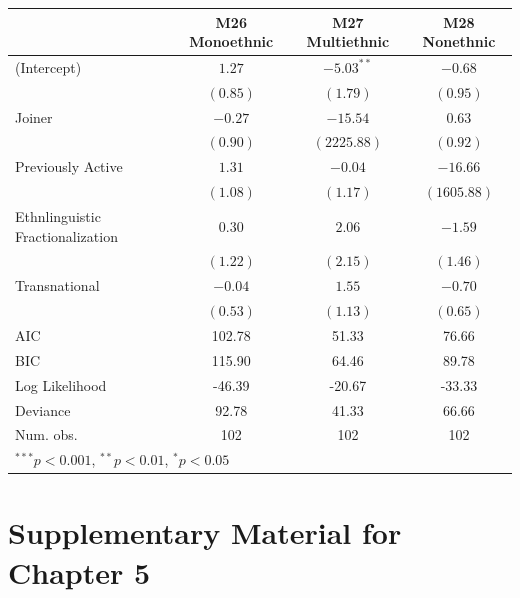 \documentclass[12pt,]{book}
\let\origtable\table
\let\endorigtable\endtable
\renewenvironment{table}[1][2] {
    \singlespacing
    \expandafter\origtable\expandafter[H]
} {
    \endorigtable
}
\theoremstyle{definition}
\theoremstyle{definition}
\theoremstyle{definition}
\theoremstyle{remark}
\begin{document}
\begin{table}
\begin{center}
\begin{tabular}{l c c c }
\hline
 & M26 Monoethnic & M27 Multiethnic & M28 Nonethnic \\
\hline
(Intercept)                      & $1.27$   & $-5.03^{**}$ & $-0.68$     \\
                                 & $(0.85)$ & $(1.79)$     & $(0.95)$    \\
Joiner                           & $-0.27$  & $-15.54$     & $0.63$      \\
                                 & $(0.90)$ & $(2225.88)$  & $(0.92)$    \\
Previously Active                & $1.31$   & $-0.04$      & $-16.66$    \\
                                 & $(1.08)$ & $(1.17)$     & $(1605.88)$ \\
Ethnlinguistic Fractionalization & $0.30$   & $2.06$       & $-1.59$     \\
                                 & $(1.22)$ & $(2.15)$     & $(1.46)$    \\
Transnational                    & $-0.04$  & $1.55$       & $-0.70$     \\
                                 & $(0.53)$ & $(1.13)$     & $(0.65)$    \\
\hline
AIC                              & 102.78   & 51.33        & 76.66       \\
BIC                              & 115.90   & 64.46        & 89.78       \\
Log Likelihood                   & -46.39   & -20.67       & -33.33      \\
Deviance                         & 92.78    & 41.33        & 66.66       \\
Num. obs.                        & 102      & 102          & 102         \\
\hline
\multicolumn{4}{l}{\scriptsize{$^{***}p<0.001$, $^{**}p<0.01$, $^*p<0.05$}}
\end{tabular}
\caption{Logit Models of Rebel Group Ethnic Composition (Secessionist Conflicts Only)}
\label{tab:comp-sec}
\end{center}
\end{table}

\hypertarget{supplementary-material-for-chapter-5}{%
\section{Supplementary Material for Chapter
5}\label{supplementary-material-for-chapter-5}}
\end{document}

